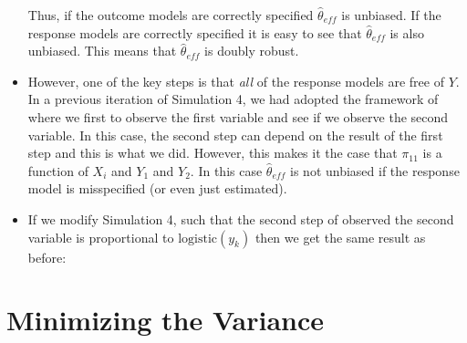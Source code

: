 \documentclass[12pt]{article}
\newcommand{\logistic}{{\text{logistic}}}
\begin{document}
\begin{itemize}
    Thus, if the outcome models are correctly specified $\hat \theta_{eff}$ is
    unbiased. If the response models are correctly specified it is easy to see
    that $\hat \theta_{eff}$ is also unbiased. This means that $\hat
    \theta_{eff}$ is doubly robust.

  \item However, one of the key steps is that \textit{all} of the response
    models are free of $Y$. In a previous iteration of Simulation 4, we had
    adopted the framework of \cite{robins1997non} where we first to observe the
    first variable and see if we observe the second variable. In this case, the
    second step can depend on the result of the first step and this is what we
    did. However, this makes it the case that $\pi_11$ is a function of $X_i$
    and $Y_1$ and $Y_2$. In this case $\hat \theta_{eff}$ is not unbiased if the
    response model is misspecified (or even just estimated).

  \item If we modify Simulation 4, such that the second step of observed the
    second variable is proportional to $\logistic(y_k)$ then we get the same
    result as before:

    
    
    
  
\end{itemize}

\newpage

% 

\section*{Minimizing the Variance}
\end{document}

